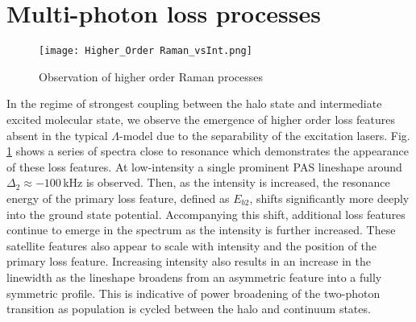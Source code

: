 %

\section{Multi-photon loss processes} \label{sec:highE_coupling}
	\begin{figure} 
	\centerline{
	  \texttt{[image: Higher\_Order Raman\_vsInt.png]}}
	  \caption{Observation of higher order Raman processes}{}
	  \label{fig:highIntMultiPhoton}
	\end{figure}
In the regime of strongest coupling between the halo state and intermediate excited molecular state, we observe the emergence of higher order loss features absent in the typical $\Lambda$-model due to the separability of the excitation lasers. %
Fig.\,\ref{fig:highIntMultiPhoton} shows a series of spectra close to resonance which demonstrates the appearance of these loss features.
At low-intensity a single prominent PAS lineshape around $\Delta_2 \approx -100$\,kHz is observed.
Then, as the intensity is increased, the resonance energy of the primary loss feature, defined as $E_{b2}$, shifts significantly more deeply into the ground state potential.
Accompanying this shift, additional loss features continue to emerge in the spectrum as the intensity is further increased. These satellite features also appear to scale with intensity and the position of the primary loss feature.
Increasing intensity also results in an increase in the linewidth as the lineshape broadens from an asymmetric feature into a fully symmetric profile.
This is indicative of power broadening of the two-photon transition as population is cycled between the halo and continuum states.

